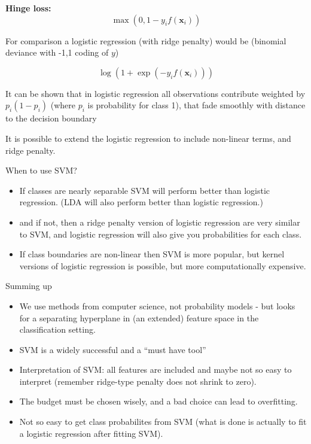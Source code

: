 \documentclass[10pt,ignorenonframetext,]{beamer}
\providecommand{\tightlist}{%
  \setlength{\itemsep}{0pt}\setlength{\parskip}{0pt}}
\begin{document}
\begin{frame}

\textbf{Hinge loss:} \[\max(0,1-y_if({\boldsymbol x}_i))\]

For comparison a logistic regression (with ridge penalty) would be
(binomial deviance with -1,1 coding of \(y\))

\[ \log(1+\exp(-y_i f({\boldsymbol x}_i)))\]

It can be shown that in logistic regression all observations contribute
weighted by \(p_i(1-p_i)\) (where \(p_i\) is probability for class 1),
that fade smoothly with distance to the decision boundary

It is possible to extend the logistic regression to include non-linear
terms, and ridge penalty.

\end{frame}

\begin{frame}

\begin{block}{When to use SVM?}

\begin{itemize}
\tightlist
\item
  If classes are nearly separable SVM will perform better than logistic
  regression. (LDA will also perform better than logistic regression.)
\item
  and if not, then a ridge penalty version of logistic regression are
  very similar to SVM, and logistic regression will also give you
  probabilities for each class.
\item
  If class boundaries are non-linear then SVM is more popular, but
  kernel versions of logistic regression is possible, but more
  computationally expensive.
\end{itemize}

\end{block}

\end{frame}

\begin{frame}{Summing up}

\begin{itemize}
\tightlist
\item
  We use methods from computer science, not probability models - but
  looks for a separating hyperplane in (an extended) feature space in
  the classification setting.
\item
  SVM is a widely successful and a ``must have tool''
\item
  Interpretation of SVM: all features are included and maybe not so easy
  to interpret (remember ridge-type penalty does not shrink to zero).
\item
  The budget must be chosen wisely, and a bad choice can lead to
  overfitting.
\item
  Not so easy to get class probabilites from SVM (what is done is
  actually to fit a logistic regression after fitting SVM).
\end{itemize}

\end{frame}
\end{document}
